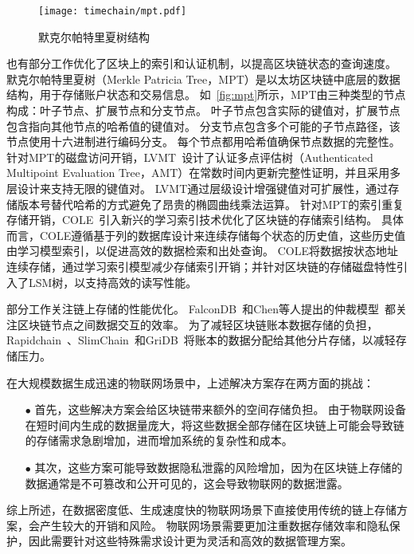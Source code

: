 \begin{figure}[t]
    \centering
    \texttt{[image: timechain/mpt.pdf]}
    \caption{默克尔帕特里夏树结构}
    \label{fig:mpt}
\end{figure}

也有部分工作优化了区块上的索引和认证机制，以提高区块链状态的查询速度。
默克尔帕特里夏树（Merkle Patricia Tree，MPT）是以太坊区块链中底层的数据结构，用于存储账户状态和交易信息。
如~\autoref{fig:mpt}所示，MPT由三种类型的节点构成：叶子节点、扩展节点和分支节点。
叶子节点包含实际的键值对，扩展节点包含指向其他节点的哈希值的键值对。
分支节点包含多个可能的子节点路径，该节点使用十六进制进行编码分支。
每个节点都用哈希值确保节点数据的完整性。
针对MPT的磁盘访问开销，LVMT~\cite{li2023lvmt}设计了认证多点评估树（Authenticated Multipoint Evaluation Tree，AMT）在常数时间内更新完整性证明，并且采用多层设计来支持无限的键值对。
LVMT通过层级设计增强键值对可扩展性，通过存储版本号替代哈希的方式避免了昂贵的椭圆曲线乘法运算。
针对MPT的索引重复存储开销，COLE~\cite{zhang2024cole}引入新兴的学习索引技术优化了区块链的存储索引结构。
具体而言，COLE遵循基于列的数据库设计来连续存储每个状态的历史值，这些历史值由学习模型索引，以促进高效的数据检索和出处查询。
COLE将数据按状态地址连续存储，通过学习索引模型减少存储索引开销；并针对区块链的存储磁盘特性引入了LSM树，以支持高效的读写性能。

部分工作关注链上存储的性能优化。
FalconDB~\cite{peng2020falcondb}和Chen等人提出的仲裁模型~\cite{chen2022blockchain}都关注区块链节点之间数据交互的效率。
为了减轻区块链账本数据存储的负担，Rapidchain~\cite{zamani2018rapidchain}、SlimChain~\cite{xu2021slimchain}和GriDB~\cite{hong2023gridb}将账本的数据分配给其他分片存储，以减轻存储压力。

在大规模数据生成迅速的物联网场景中，上述解决方案存在两方面的挑战：

\begin{itemize}
    \item[$\bullet$] 首先，这些解决方案会给区块链带来额外的空间存储负担。
    由于物联网设备在短时间内生成的数据量庞大，将这些数据全部存储在区块链上可能会导致链的存储需求急剧增加，进而增加系统的复杂性和成本。
    \item[$\bullet$] 其次，这些方案可能导致数据隐私泄露的风险增加，因为在区块链上存储的数据通常是不可篡改和公开可见的，这会导致物联网的数据泄露。
\end{itemize}

综上所述，在数据密度低、生成速度快的物联网场景下直接使用传统的链上存储方案，会产生较大的开销和风险。
物联网场景需要更加注重数据存储效率和隐私保护，因此需要针对这些特殊需求设计更为灵活和高效的数据管理方案。

